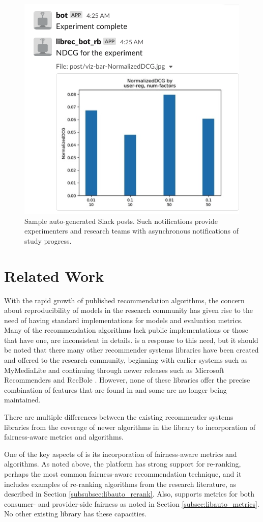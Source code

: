 \begin{figure}[ht!]
    \centering
    \includegraphics[width=0.6\linewidth]{imgs/la/slack-post.png}
    \caption{Sample auto-generated Slack posts. Such notifications provide experimenters and research teams with asynchronous notifications of study progress.}
    \label{fig:slack}
    \vspace{-0.15in}
\end{figure}

\section{Related Work}

With the rapid growth of published recommendation algorithms, the concern about reproducibility of models in the research community has given rise to the need of having standard implementations for models and evaluation metrics. Many of the recommendation algorithms lack public implementations or those that have one, are inconsistent in details. \libauto{} is a response to this need, but it should be noted that there many other recommender systems libraries have been created and offered to the research community, beginning with earlier systems such as MyMediaLite \cite{MyMediaLite} and continuing through newer releases such as Microsoft Recommenders \cite{MicrosoftRecommenders} and RecBole \cite{recbole}. However, none of these libraries offer the precise combination of features that are found in \libauto{} and some are no longer being maintained.

There are multiple differences between the existing recommender systems libraries from the coverage of newer algorithms in the library to incorporation of fairness-aware metrics and algorithms.

One of the key aspects of \libauto{} is its incorporation of fairness-aware metrics and algorithms. As noted above, the platform has strong support for re-ranking, perhaps the most common fairness-aware recommendation technique, and it includes examples of re-ranking algorithms from the research literature, as described in Section \ref{subsubsec:libauto_rerank}. Also, \libauto{} supports metrics for both consumer- and provider-side fairness as noted in Section \ref{subsec:libauto_metrics}. No other existing library has these capacities. 


